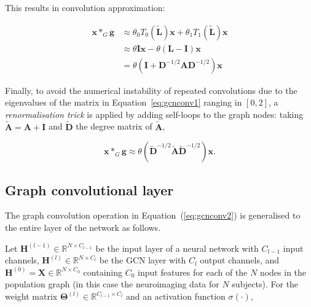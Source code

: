 This results in convolution approximation:

\begin{align}
    \mathbf{x} *_G \mathbf{g} &\approx \theta_0 T_0(\mathbf{\tilde{L}}) \mathbf{x} + \theta_1 T_1(\mathbf{\tilde{L}}) \mathbf{x} \\
    &\approx \theta \mathbf{I} \mathbf{x} - \theta (\mathbf{L} - \mathbf{I}) \mathbf{x} \\
    \label{eq:gcnconv1}
    &= \theta(\mathbf{I} + \mathbf{D}^{-1/2}\mathbf{A}\mathbf{D}^{-1/2})\mathbf{x}
\end{align}

Finally, to avoid the numerical instability of repeated convolutions due to the eigenvalues of the matrix in Equation~\eqref{eq:gcnconv1} ranging in $[0, 2]$, a \textit{renormalisation trick} is applied by adding self-loops to the graph nodes: taking $\mathbf{\tilde{A}} = \mathbf{A} + \mathbf{I}$ and $\mathbf{\tilde{D}}$ the degree matrix of $\mathbf{\tilde{A}}$, 

\begin{equation}
    \label{eq:gcnconv2}
    \mathbf{x} *_G \mathbf{g} \approx \theta(\mathbf{\tilde{D}}^{-1/2}\mathbf{\tilde{A}}\mathbf{\tilde{D}}^{-1/2})\mathbf{x}.
\end{equation}
 


\subsection{Graph convolutional layer}
The graph convolution operation in Equation~(\ref{eq:gcnconv2}) is generalised to the entire layer of the network as follows. 

Let $\mathbf{H}^{(l-1)} \in \mathbb{R}^{N\times C_{l-1}}$ be the input layer of a neural network with $C_{l-1}$ input channels, $\mathbf{H}^{(l)} \in \mathbb{R}^{N\times C_{l}}$ be the GCN layer with $C_{l}$ output channels, and $\mathbf{H}^{(0)} = \mathbf{X} \in \mathbb{R}^{N \times C_0}$ containing $C_0$ input features for each of the $N$ nodes in the population graph (in this case the neuroimaging data for $N$ subjects). For the weight matrix $\mathbf{\Theta}^{(l)} \in \mathbb{R}^{C_{l-1}\times C_{l}}$ and an activation function $\sigma(\cdot)$,

